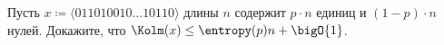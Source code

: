 Пусть $x \coloneqq \langle{011010010 \dotso 10110}\rangle$ длины $n$ содержит $p \cdot n$ единиц и $(1 - p) \cdot
n$ нулей. Докажите, что $\Kolm(x) \le \entropy(p) n + \bigO{1}$.
